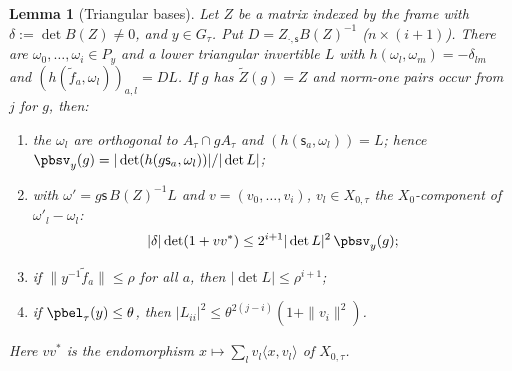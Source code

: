 \documentclass[10pt]{amsart}
\newtheorem{lemma}[theorem]{Lemma}
\theoremstyle{definition}
\theoremstyle{remark}
\begin{document}
\begin{lemma}[Triangular bases]\label{pbs:tri}
Let $Z$ be a matrix indexed by the frame with $\delta:=\det B(Z)\ne0$, and $y\in G_\tau$. Put $D=Z_{
\cdot,\mathsf s}B(Z)^{-1}$ ($n\times(i+1)$). There are $\omega_0,\dots,\omega_i\in P_y$ and a lower
triangular invertible $L$ with $h(\omega_l,\omega_m)=-\delta_{lm}$ and $(h(\tilde f_a,\omega_l))_{a,l}=
DL$. If $g$ has $\tilde Z(g)=Z$ and norm-one pairs occur from $j$ for $g$, then:
\begin{enumerate}
\item[(a)] the $\omega_l$ are orthogonal to $A_\tau\cap gA_\tau$ and $(h(\mathsf s_a,\omega_l))=L$; hence
$\pbsv_y(g)=|\det(h(g\mathsf s_a,\omega_l))|/|\det L|$;
\item[(b)] with $\omega'=g\mathsf s\,B(Z)^{-1}L$ and $v=(v_0,\dots,v_i)$, $v_l\in X_{0,\tau}$ the
$X_0$-component of $\omega'_l-\omega_l$:
\[
|\delta|\det(1+vv^*)\le2^{i+1}|\det L|^2\,\pbsv_y(g);
\]
\item[(c)] if $\|y^{-1}\tilde f_a\|\le\rho$ for all $a$, then $|\det L|\le\rho^{i+1}$;
\item[(d)] if $\pbel_\tau(y)\le\theta$, then $|L_{ii}|^2\le\theta^{2(j-i)}(1+\|v_i\|^2)$.
\end{enumerate}
Here $vv^*$ is the endomorphism $x\mapsto\sum_lv_l\langle x,v_l\rangle$ of $X_{0,\tau}$.
\end{lemma}
\end{document}
